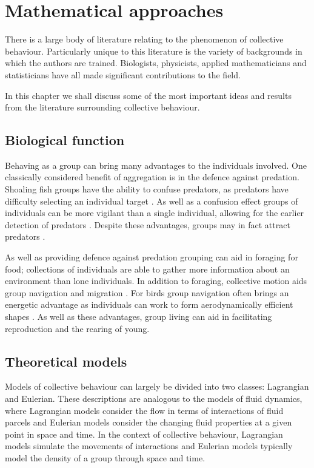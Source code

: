 \chapter{Mathematical approaches}
\label{cha:lit_review}

There is a large body of literature relating to the phenomenon of collective behaviour. Particularly unique to this literature is the variety of backgrounds in which the authors are trained. Biologists, physicists, applied mathematicians and statisticians have all made significant contributions to the field.

In this chapter we shall discuss some of the most important ideas and results from the literature surrounding collective behaviour.

\section{Biological function}
\label{sec:biological_function}

Behaving as a group can bring many advantages to the individuals involved. One classically considered  benefit of aggregation is in the defence against predation. Shoaling fish groups have the ability to confuse predators, as predators have difficulty selecting an individual target \citep{landeau86}. As well as a confusion effect groups of individuals can be more vigilant than a single individual, allowing for the earlier detection of predators \citep{pitcher93}. Despite these advantages, groups may in fact attract predators \citep{wittenberger85}.

As well as providing defence against predation grouping can aid in foraging for food; collections of individuals are able to gather more information about an environment than lone individuals. In addition to foraging, collective motion aids group navigation and migration \citep{simmons04}. For birds group navigation often brings an energetic advantage as individuals can work to form aerodynamically efficient shapes \citep{weimerskirch01}. As well as these advantages, group living can aid in facilitating reproduction and the rearing of young.

\section{Theoretical models}
\label{sec:models}

Models of collective behaviour can largely be divided into two classes: Lagrangian and Eulerian. These descriptions are analogous to the models of fluid dynamics, where Lagrangian models consider the flow in terms of interactions of fluid parcels and Eulerian models consider the changing fluid properties at a given point in space and time. In the context of collective behaviour, Lagrangian models simulate the movements of interactions and Eulerian models typically model the density of a group through space and time.

